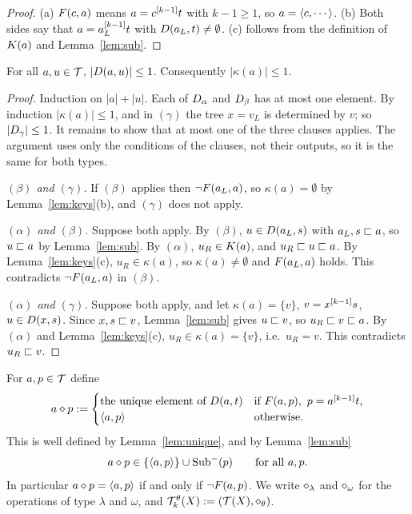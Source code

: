 \begin{proof}
(a) $F(c,a)$ means $a=c^{[k-1]}t$ with $k-1\ge1$, so
$a=\langle c,\cdots\rangle$. (b) Both sides say that $a=a_L^{[k-1]}t$ with
$D(a_L,t)\ne\emptyset$. (c) follows from the definition of $K(a)$ and
Lemma~\ref{lem:sub}.
\end{proof}

\begin{lemma}[Uniqueness]\label{lem:unique}
For all $a,u\in\mathcal{T}$, $|D(a,u)|\le1$. Consequently $|\kappa(a)|\le1$.
\end{lemma}

\begin{proof}
Induction on $|a|+|u|$. Each of $D_\alpha$ and $D_\beta$ has at most one
element. By induction $|\kappa(a)|\le1$, and in $(\gamma)$ the tree $x=v_L$
is determined by $v$; so $|D_\gamma|\le1$. It remains to show that at most
one of the three clauses applies. The argument uses only the conditions of
the clauses, not their outputs, so it is the same for both types.

\emph{$(\beta)$ and $(\gamma)$.} If $(\beta)$ applies then $\neg F(a_L,a)$,
so $\kappa(a)=\emptyset$ by Lemma~\ref{lem:keys}(b), and $(\gamma)$ does not
apply.

\emph{$(\alpha)$ and $(\beta)$.} Suppose both apply. By $(\beta)$,
$u\in D(a_L,s)$ with $a_L,s\sqsubset a$, so $u\sqsubset a$ by Lemma~\ref{lem:sub}. By
$(\alpha)$, $u_R\in K(a)$, and $u_R\sqsubset u\sqsubset a$. By
Lemma~\ref{lem:keys}(c), $u_R\in\kappa(a)$, so $\kappa(a)\ne\emptyset$ and
$F(a_L,a)$ holds. This contradicts $\neg F(a_L,a)$ in $(\beta)$.

\emph{$(\alpha)$ and $(\gamma)$.} Suppose both apply, and let
$\kappa(a)=\{v\}$, $v=x^{[k-1]}s$, $u\in D(x,s)$. Since $x,s\sqsubset v$,
Lemma~\ref{lem:sub} gives $u\sqsubset v$, so $u_R\sqsubset v\sqsubset a$. By $(\alpha)$ and
Lemma~\ref{lem:keys}(c), $u_R\in\kappa(a)=\{v\}$, i.e.\ $u_R=v$. This
contradicts $u_R\sqsubset v$.
\end{proof}

\begin{definition}\label{def:op}
For $a,p\in\mathcal{T}$ define
\[
 a\op p:=\begin{cases}
   \text{the unique element of }\Dec(a,t) & \text{if } \Fire(a,p),\ p=\tw{a}{k-1}{t},\\
   \pr{a}{p} & \text{otherwise.}
 \end{cases}
\]
This is well defined by Lemma~\ref{lem:unique}, and by Lemma~\ref{lem:sub}
\begin{equation}\label{eq:opsub}
  a\mathbin{\diamond} p\in\{\langle a,p\rangle\}\cup\operatorname{Sub}^{-}(p)\qquad\text{for all }a,p .
\end{equation}
In particular $a\mathbin{\diamond} p=\langle a,p\rangle$ if and only if $\neg F(a,p)$. We write
$\mathbin{\diamond}_\lambda$ and $\mathbin{\diamond}_\omega$ for the operations of type $\lambda$ and
$\omega$, and $\mathcal{T}_k^\theta(X):=(\mathcal{T}(X),\mathbin{\diamond}_\theta)$.
\end{definition}

